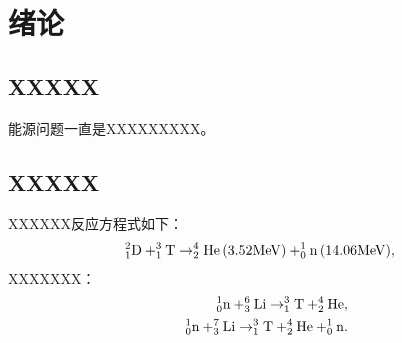 \chapter{绪论}\label{chap1}

\section{XXXXX}
能源问题一直是XXXXXXXXX\cite{cowley2016quest}。

\section{XXXXX}

XXXXXX反应方程式如下：
\begin{eqnarray}
    {\rm ^2_1D+^3_1T\rightarrow ^4_2He\left(3.52MeV\right)+^1_0n\left(14.06MeV\right)}, \label{EQDHreaction}
\end{eqnarray}
XXXXXXX：
\begin{eqnarray}
        &&{\rm ^1_0n+^6_3Li\rightarrow ^3_1T+^4_2He}, \label{EQnLi6Reaction}\\
        &&{\rm ^1_0n+^7_3Li\rightarrow ^3_1T+^4_2He+^1_0n}. \label{EQnLi7Reaction}
\end{eqnarray}
